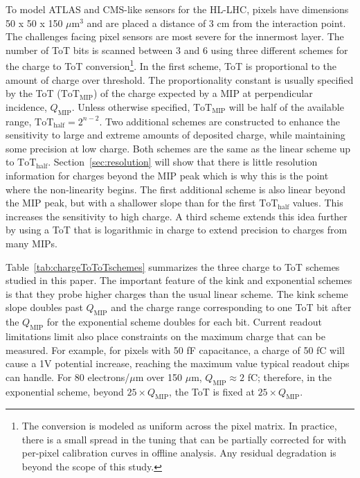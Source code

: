 \documentclass[12pt]{article}
\begin{document}
To model ATLAS and CMS-like sensors for the HL-LHC, pixels have dimensions 50 x 50 x 150 $\mu$m$^3$ and are placed a distance of 3 cm from the interaction point.  The challenges facing pixel sensors are most severe for the innermost layer.  The number of ToT bits is scanned between $3$ and $6$ using three different schemes for the charge to ToT conversion\footnote{The conversion is modeled as uniform across the pixel matrix.  In practice, there is a small spread in the tuning that can be partially corrected for with per-pixel calibration curves in offline analysis.  Any residual degradation is beyond the scope of this study.}.  In the first scheme, ToT is proportional to the amount of charge over threshold.  The proportionality constant is usually specified by the ToT ($\text{ToT}_\text{MIP}$) of the charge expected by a MIP at perpendicular incidence, $Q_\text{MIP}$.  Unless otherwise specified, $\text{ToT}_\text{MIP}$ will be half of the available range, $\text{ToT}_\text{half} = 2^{n-2}$. Two additional schemes are constructed to enhance the sensitivity to large and extreme amounts of deposited charge, while maintaining some precision at low charge.  Both schemes are the same as the linear scheme up to $\text{ToT}_\text{half}$.  Section~\ref{sec:resolution} will show that there is little resolution information for charges beyond the MIP peak which is why this is the point where the non-linearity begins.  The first additional scheme is also linear beyond the MIP peak, but with a shallower slope than for the first $\text{ToT}_\text{half}$ values.  This increases the sensitivity to high charge.  A third scheme extends this idea further by using a ToT that is logarithmic in charge to extend precision to charges from many MIPs.


Table~\ref{tab:chargeToToTschemes} summarizes the three charge to ToT schemes studied in this paper.   The important feature of the kink and exponential schemes is that they probe higher charges than the usual linear scheme.  The kink scheme slope doubles past $Q_\text{MIP}$ and the charge range corresponding to one ToT bit after the $Q_\text{MIP}$ for the exponential scheme doubles for each bit.  Current readout limitations limit also place constraints on the maximum charge that can be measured.  For example, for pixels with 50 fF capacitance, a charge of 50 fC will cause a 1V potential increase, reaching the maximum value typical readout chips can handle.   For 80 electrons/$\mu$m over 150 $\mu$m, $Q_\text{MIP}\approx 2$ fC; therefore, in the exponential scheme, beyond $25\times Q_\text{MIP}$, the ToT is fixed at $25\times Q_\text{MIP}$.  
\end{document}
